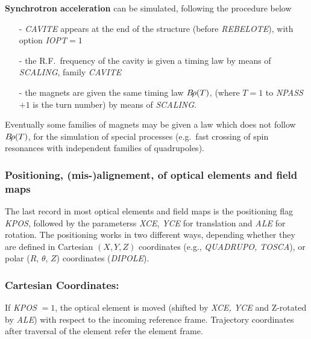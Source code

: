 \noindent\textbf{Synchrotron acceleration} can be simulated, following the 
procedure below  
\begin{itemize}
\item[-] \textsl{CAVITE} appears at the end of the structure (before
\textsl{REBELOTE}), with option \textsl{IOPT}$=1$ 

\item[-] the R.F.\ frequency of the cavity is given a timing law by 
means of \textsl{SCALING}, family \textsl{CAVITE}

\item[-] the magnets are given the same timing law $ B\!\rho (T)$,  
(where $T=1 $ to \textsl{NPASS}$+1$ is the turn number) by means of \textsl{SCALING}. \par
\end{itemize}

\noindent Eventually some families of magnets may be given a law which does 
not follow $ B\!\rho (T)$,  for the simulation of special processes (e.g.\ 
fast crossing of spin resonances with independent families of 
quadrupoles). 





\subsubsection{Positioning, (mis-)alignement, 
of optical elements  and field maps} \label{sec4.6.2} 

The last record in most optical elements and field maps is the positioning flag 
\textsl{KPOS}\index{KPOS|textbf}, followed by the parameterss \textsl{XCE}, \textsl{YCE} 
for translation and \textsl{ALE} for rotation. The positioning works in two different ways, 
depending  whether they are defined in 
Cartesian $ (X, Y, Z) $ coordinates (e.g., \textsl{QUADRUPO, TOSCA}),
 or polar 
 ($R$, $\theta$, $Z$)  coordinates (\textsl{DIPOLE}). 
 
 \subsubsection*{Cartesian Coordinates:} 
 
 If \textsl{KPOS} $ =1$, the optical element is moved (shifted by \textsl{XCE, YCE} and Z-rotated by 
\textsl{ALE}) with respect to the incoming reference frame. Trajectory coordinates after traversal of the 
element refer the element frame. 

